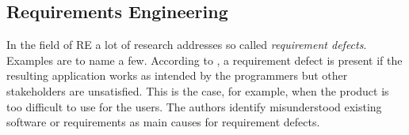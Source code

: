 


\subsection{Requirements Engineering}
\label{chp:fundamentals:sec:vagueness:subsec:requirement_engineering}
In the field of \ac{RE} a lot of research addresses so called \textit{requirement defects}.
Examples are \textcite{Lauesen:2001,Kosman:1997,Blackburn:2001} to name a few.
According to \textcite{Lauesen:2001}, a requirement defect is present if the resulting application works as intended by the programmers but other stakeholders are unsatisfied.
This is the case, for example, when the product is too difficult to use for the users.
The authors identify misunderstood existing software or requirements as main causes for requirement defects.

